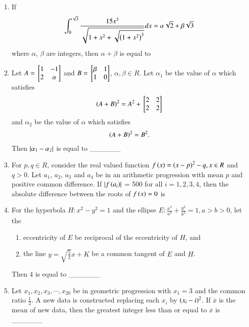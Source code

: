\documentclass[journal]{IEEEtran}
\begin{document}
\begin{enumerate}
\item If 
\begin{align*}
\int_{0}^{\sqrt{3}}\frac{15x^3}{\sqrt{1+x^2+\sqrt{\left(1+x^2\right)^3}}}dx= \alpha\sqrt{2} + \beta\sqrt{3}
\end{align*}
where $\alpha$, $\beta$ are integers, then $\alpha+\beta$ is equal to \\
\item Let $A={}\left[\begin{matrix}
    1 & -1 \\ 2 & \alpha
\end{matrix}\right]$ and $B={}\left[\begin{matrix}
    \beta & 1 \\ 1 & 0
\end{matrix}\right]$, $\alpha, \beta \in R$. Let $\alpha_1$ be the value of $\alpha$ which satisfies 
\begin{align*}
    \left(A+B\right)^2 = A^2 + {}\left[\begin{matrix}
        2 & 2 \\ 2 & 2
    \end{matrix}\right]
\end{align*}
and $\alpha_2$ be the value of $\alpha$ which satisfies
\begin{align*}
    \left(A+B\right)^2 = B^2.
\end{align*}
Then $\left\vert\alpha_1 - \alpha_2\right\vert$ is equal to \_\_\_\_\_\_ \\
\item For $p, q \in R$, consider the real valued function $f\left(x\right) = \left(x - p\right)^2 - q, x \in R$ and $q > 0$. Let $a_1$, $a_2$, $a_3$ and $a_4$ be in an arithmetic progression with mean $p$ and positive common difference. If $\left\vert f\left(a_i\right)\right\vert$ = 500 for all $i = 1, 2, 3, 4$, then the absolute difference between the roots of $f\left(x\right) = 0$ is \\
\item For the hyperbola $H: x^2 - y^2 = 1$ and the ellipse $E: \frac{x^2}{a^2} + \frac{y^2}{b^2} = 1, a > b > 0$, let the
\begin{enumerate}
    \item eccentricity of $E$ be reciprocal of the eccentricity of $H$, and
    \item the line $y = \sqrt{\frac{5}{2}} x + K$ be a common tangent of $E$ and $H$.
\end{enumerate}
Then 4 is equal to \_\_\_\_\_\_ \\
\item Let $x_1, x_2, x_3, \cdots, x_{20}$ be in geometric progression with $x_1 = 3$ and the common ratio $\frac{1}{2}$. A new data is constructed replacing each $x_i$ by $\left(x_i - i\right)^2$. If $\overline{x}$ is the mean of new data, then the greatest integer less than or equal to $\overline{x}$ is  \_\_\_\_\_\_ \\

\end{enumerate}
\end{document}
